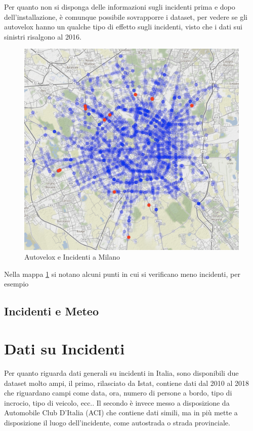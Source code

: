 \documentclass[a4paper]{report}
\begin{document}
Per quanto non si disponga delle informazioni sugli incidenti prima e dopo dell'installazione, 
è comunque possibile sovrapporre i dataset, per vedere se gli autovelox hanno un qualche tipo di 
effetto sugli incidenti, visto che i dati sui sinistri risalgono al 2016.

\begin{figure}
    \includegraphics[width=\linewidth]{../src/autovelox/autovelox_incidenti_2014.png}
    \caption{Autovelox e Incidenti a Milano}
    \label{fig:autovelox-incidenti}
\end{figure}

Nella mappa \ref{fig:autovelox-incidenti} si notano alcuni punti in cui si verificano meno incidenti, 
per esempio 



\section{Incidenti e Meteo}

\chapter{Dati su Incidenti}

Per quanto riguarda dati generali su incidenti in Italia, sono disponibili due dataset molto ampi, 
il primo, rilasciato da Istat, contiene dati dal 2010 al 2018 che riguardano campi come data, ora, 
numero di persone a bordo, tipo di incrocio, tipo di veicolo, ecc..
Il secondo è invece messo a disposizione da Automobile Club D'Italia (ACI) che contiene dati simili, 
ma in più mette a disposizione il luogo dell'incidente, come autostrada o strada provinciale.
\end{document}
